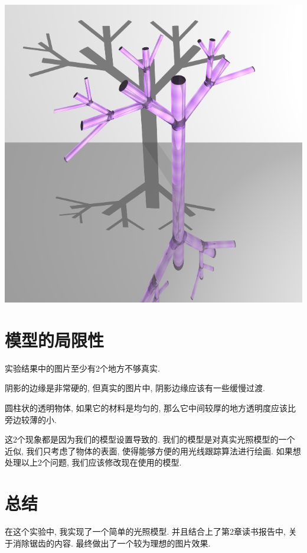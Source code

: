\documentclass[11pt]{article}
\begin{document}
\begin{center}
\includegraphics[scale=0.36]{tree.png}
\end{center}

\section{模型的局限性}
实验结果中的图片至少有2个地方不够真实.
\begin{compactitem}
\item 阴影的边缘是非常硬的, 但真实的图片中, 阴影边缘应该有一些缓慢过渡.
\item 圆柱状的透明物体, 如果它的材料是均匀的,
      那么它中间较厚的地方透明度应该比旁边较薄的小.
\end{compactitem}

这2个现象都是因为我们的模型设置导致的.
我们的模型是对真实光照模型的一个近似,
我们只考虑了物体的表面,
使得能够方便的用光线跟踪算法进行绘画.
如果想处理以上2个问题, 我们应该修改现在使用的模型.

\section{总结}
在这个实验中,
我实现了一个简单的光照模型.
并且结合上了第2章读书报告中, 关于消除锯齿的内容.
最终做出了一个较为理想的图片效果.
\end{document}
